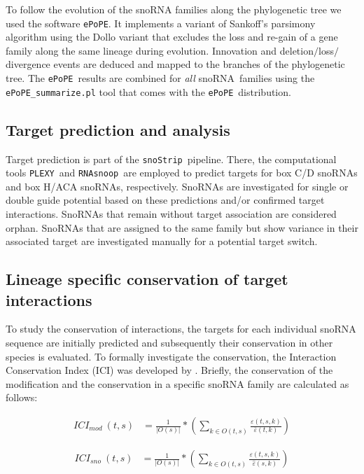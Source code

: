 \documentclass[preprint,3p,times,twocolumn]{elsarticle}
\newcommand{\sno}{snoRNA}
\newcommand{\cd}{box C/D snoRNA}
\newcommand{\haca}{box H/ACA snoRNA}
\newcommand{\snostrip}{\texttt{snoStrip}}
\newcommand{\epope}{\texttt{ePoPE}}
\newcommand{\plexy}{\texttt{PLEXY}}
\newcommand{\snoop}{\texttt{RNAsnoop}}
\begin{document}
To follow the evolution of the snoRNA families along the phylogenetic
tree we used the software \epope\cite{Hertel:2015}.  It implements a
variant of Sankoff’s parsimony algorithm using the Dollo variant that
excludes the loss and re-gain of a gene family along the same lineage
during evolution.  Innovation and deletion$/$loss$/$divergence events
are deduced and mapped to the branches of the phylogenetic tree.  The
\epope\ results are combined for \emph{all} \sno\ families using the
\texttt{ePoPE\_summarize.pl} tool that comes with the \epope\
distribution.

\subsection{Target prediction and analysis}

Target prediction is part of the \snostrip\ pipeline. There, the
computational tools \plexy\ and \snoop\ are employed to predict
targets for \cd s and \haca s, respectively.  SnoRNAs are investigated
for single or double guide potential based on these predictions and/or
confirmed target interactions. SnoRNAs that remain without target
association are considered orphan. SnoRNAs that are assigned to the
same family but show variance in their associated target are
investigated manually for a potential target switch.


\subsection{Lineage specific conservation of target interactions}
To study the conservation of interactions, the targets for each
individual snoRNA sequence are initially predicted and subsequently
their conservation in other species is evaluated. To formally
investigate the conservation, the Interaction Conservation Index (ICI)
was developed by \cite{Kehr:2014}. Briefly, the conservation of the
modification and the conservation in a specific snoRNA family are
calculated as follows:

\begin{equation}
  \begin{split}
    ICI_{mod}\:(t,s) & = \frac{1}{|O(s)|} * \left( \sum_{k\in O(t,s)} \frac{\varepsilon(t,s,k)}{\bar\varepsilon(t,k)} \right) 
  \end{split}
\end{equation}

\begin{equation}
  \begin{split}
    ICI_{sno}\:(t,s) & = \frac{1}{|O(s)|} * \left( \sum_{k\in O(t,s)} \frac{\varepsilon(t,s,k)}{\hat\varepsilon(s,k)} \right)
  \end{split}
\end{equation}
\end{document}
